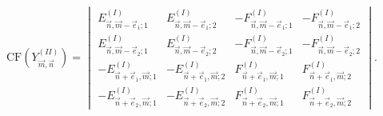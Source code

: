 \documentclass[a4paper,12pt,oneside]{article}
\theoremstyle{definition}
\begin{document}
$$\text{CF}(Y_{\vec{m},\vec{n}}^{(II)}) = \begin{vmatrix} 
    E_{\vec{n},\vec{m}-\vec{e}_1;1}^{(I)} & E_{\vec{n},\vec{m}-\vec{e}_1;2}^{(I)} & 
    -F_{\vec{n},\vec{m}-\vec{e}_1;1}^{(I)} & -F_{\vec{n},\vec{m}-\vec{e}_1;2}^{(I)} \\ 
    E_{\vec{n},\vec{m}-\vec{e}_2;1}^{(I)} & E_{\vec{n},\vec{m}-\vec{e}_2;2}^{(I)} & 
    -F_{\vec{n},\vec{m}-\vec{e}_2;1}^{(I)} & -F_{\vec{n},\vec{m}-\vec{e}_2;2}^{(I)} \\ 
    -E_{\vec{n}+\vec{e}_1,\vec{m};1}^{(I)} & -E_{\vec{n}+\vec{e}_1,\vec{m};2}^{(I)} & F_{\vec{n}+\vec{e}_1,\vec{m};1}^{(I)} & F_{\vec{n}+\vec{e}_1,\vec{m};2}^{(I)} \\ 
    -E_{\vec{n}+\vec{e}_2,\vec{m};1}^{(I)} & -E_{\vec{n}+\vec{e}_2,\vec{m};2}^{(I)} & F_{\vec{n}+\vec{e}_2,\vec{m};1}^{(I)} & F_{\vec{n}+\vec{e}_2,\vec{m};2}^{(I)} \end{vmatrix}.$$
\end{document}
